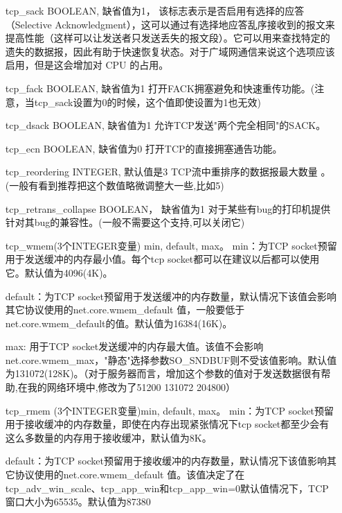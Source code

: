 \begin{enumerate}
\item[tcp\_sack] BOOLEAN,
                缺省值为1，
                该标志表示是否启用有选择的应答（Selective Acknowledgment），这可以通过有选择地应答乱序接收到的报文来提高性能（这样可以让发送者只发送丢失的报文段）。它可以用来查找特定的遗失的数据报，因此有助于快速恢复状态。对于广域网通信来说这个选项应该启用，但是这会增加对 CPU 的占用。

\item[tcp\_fack] BOOLEAN,
缺省值为1
打开FACK拥塞避免和快速重传功能。(注意，当tcp\_sack设置为0的时候，这个值即使设置为1也无效)

\item[tcp\_dsack] BOOLEAN,
缺省值为1
允许TCP发送"两个完全相同"的SACK。

\item[tcp\_ecn] BOOLEAN,
缺省值为0
打开TCP的直接拥塞通告功能。

\item[tcp\_reordering] INTEGER,
默认值是3
TCP流中重排序的数据报最大数量 。 (一般有看到推荐把这个数值略微调整大一些,比如5)

\item[tcp\_retrans\_collapse] BOOLEAN，
缺省值为1
对于某些有bug的打印机提供针对其bug的兼容性。(一般不需要这个支持,可以关闭它)

\item[tcp\_wmem(3个INTEGER变量)] min, default, max。
min：为TCP socket预留用于发送缓冲的内存最小值。每个tcp socket都可以在建议以后都可以使用它。默认值为4096(4K)。

default：为TCP socket预留用于发送缓冲的内存数量，默认情况下该值会影响其它协议使用的net.core.wmem\_default 值，一般要低于net.core.wmem\_default的值。默认值为16384(16K)。

max: 用于TCP socket发送缓冲的内存最大值。该值不会影响net.core.wmem\_max，"静态"选择参数SO\_SNDBUF则不受该值影响。默认值为131072(128K)。（对于服务器而言，增加这个参数的值对于发送数据很有帮助,在我的网络环境中,修改为了51200 131072 204800）

\item[tcp\_rmem ] (3个INTEGER变量)min, default, max。
                min：为TCP socket预留用于接收缓冲的内存数量，即使在内存出现紧张情况下tcp socket都至少会有这么多数量的内存用于接收缓冲，默认值为8K。

                default：为TCP socket预留用于接收缓冲的内存数量，默认情况下该值影响其它协议使用的net.core.wmem\_default 值。该值决定了在tcp\_adv\_win\_scale、tcp\_app\_win和tcp\_app\_win=0默认值情况下，TCP窗口大小为65535。默认值为87380


\end{enumerate}
